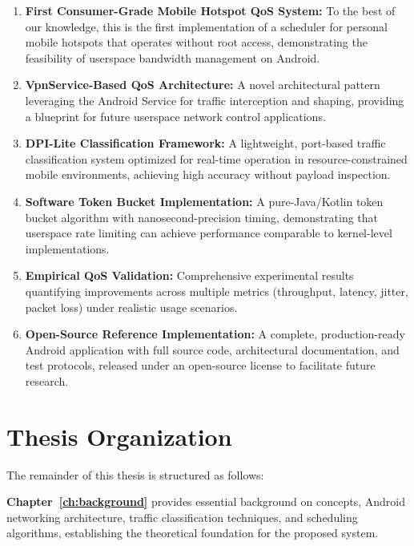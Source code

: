 \begin{enumerate}[leftmargin=*]
    \item \textbf{First Consumer-Grade Mobile Hotspot QoS System:} To the best of our knowledge, this is the first implementation of a \qos scheduler for personal mobile hotspots that operates without root access, demonstrating the feasibility of userspace bandwidth management on Android.
    
    \item \textbf{VpnService-Based QoS Architecture:} A novel architectural pattern leveraging the Android \vpn Service \api for traffic interception and shaping, providing a blueprint for future userspace network control applications.
    
    \item \textbf{DPI-Lite Classification Framework:} A lightweight, port-based traffic classification system optimized for real-time operation in resource-constrained mobile environments, achieving high accuracy without payload inspection.
    
    \item \textbf{Software Token Bucket Implementation:} A pure-Java/Kotlin token bucket algorithm with nanosecond-precision timing, demonstrating that userspace rate limiting can achieve performance comparable to kernel-level implementations.
    
    \item \textbf{Empirical QoS Validation:} Comprehensive experimental results quantifying \qos improvements across multiple metrics (throughput, latency, jitter, packet loss) under realistic usage scenarios.
    
    \item \textbf{Open-Source Reference Implementation:} A complete, production-ready Android application with full source code, architectural documentation, and test protocols, released under an open-source license to facilitate future research.
\end{enumerate}

\section{Thesis Organization}
\label{sec:organization}

The remainder of this thesis is structured as follows:

\textbf{Chapter~\ref{ch:background}} provides essential background on \qos concepts, Android networking architecture, traffic classification techniques, and scheduling algorithms, establishing the theoretical foundation for the proposed system.

